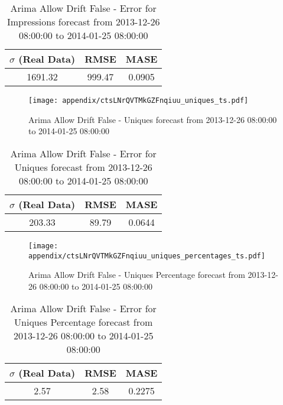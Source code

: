 \begin{table}[H]
\centering
\footnotesize
\begin{tabular}{ccc}
$\sigma$ (Real Data) & RMSE & MASE   \\ \hline
1691.32 & 999.47 & 0.0905 \\
\end{tabular}

\vspace{0.5cm}

\caption{
Arima Allow Drift False - Error for Impressions forecast from 2013-12-26 08:00:00 to 2014-01-25 08:00:00}
\end{table}

\begin{figure}[H] \begin{center} \leavevmode
\texttt{[image: appendix/ctsLNrQVTMkGZFnqiuu\_uniques\_ts.pdf]} \caption{
Arima Allow Drift False - Uniques forecast from 2013-12-26 08:00:00 to 2014-01-25 08:00:00} \label{fig:appendix/ctsLNrQVTMkGZFnqiuu_uniques_ts.pdf} \end{center}
\end{figure}

\begin{table}[H]
\centering
\footnotesize
\begin{tabular}{ccc}
$\sigma$ (Real Data) & RMSE & MASE   \\ \hline
203.33 & 89.79 & 0.0644 \\
\end{tabular}

\vspace{0.5cm}

\caption{
Arima Allow Drift False - Error for Uniques forecast from 2013-12-26 08:00:00 to 2014-01-25 08:00:00}
\end{table}

\begin{figure}[H] \begin{center} \leavevmode
\texttt{[image: appendix/ctsLNrQVTMkGZFnqiuu\_uniques\_percentages\_ts.pdf]} \caption{
Arima Allow Drift False - Uniques Percentage forecast from 2013-12-26 08:00:00 to 2014-01-25 08:00:00} \label{fig:appendix/ctsLNrQVTMkGZFnqiuu_uniques_percentages_ts.pdf} \end{center}
\end{figure}

\begin{table}[H]
\centering
\footnotesize
\begin{tabular}{ccc}
$\sigma$ (Real Data) & RMSE & MASE   \\ \hline
2.57 & 2.58 & 0.2275 \\
\end{tabular}

\vspace{0.5cm}

\caption{
Arima Allow Drift False - Error for Uniques Percentage forecast from 2013-12-26 08:00:00 to 2014-01-25 08:00:00}
\end{table}

